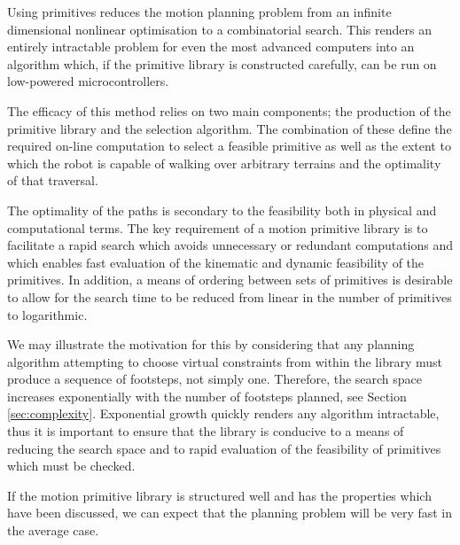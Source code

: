 Using primitives reduces the motion planning problem from an infinite dimensional nonlinear optimisation to a combinatorial search. This renders an entirely intractable problem for even the most advanced computers into an algorithm which, if the primitive library is constructed carefully, can be run on low-powered microcontrollers.

The efficacy of this method relies on two main components; the production of the primitive library and the selection algorithm. The combination of these define the required on-line computation to select a feasible primitive as well as the extent to which the robot is capable of walking over arbitrary terrains and the optimality of that traversal.

The optimality of the paths is secondary to the feasibility both in physical and computational terms. The key requirement of a motion primitive library is to facilitate a rapid search which avoids unnecessary or redundant computations and which enables fast evaluation of the kinematic and dynamic feasibility of the primitives. In addition, a means of ordering between sets of primitives is desirable to allow for the search time to be reduced from linear in the number of primitives to logarithmic.

We may illustrate the motivation for this by considering that any planning algorithm attempting to choose virtual constraints from within the library must produce a sequence of footsteps, not simply one. Therefore, the search space increases exponentially with the number of footsteps planned, see Section \ref{sec:complexity}. Exponential growth quickly renders any algorithm intractable, thus it is important to ensure that the library is conducive to a means of reducing the search space and to rapid evaluation of the feasibility of primitives which must be checked.

If the motion primitive library is structured well and has the properties which have been discussed, we can expect that the planning problem will be very fast in the average case.